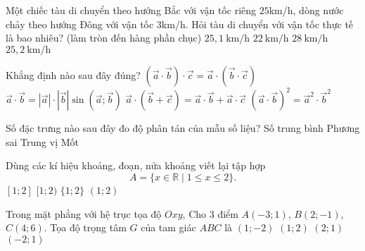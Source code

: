 \begin{ex}%
Một chiếc tàu di chuyển theo hướng Bắc với vận tốc riêng $25$km/h, dòng nước chảy theo hướng Đông với vận tốc $3$km/h. Hỏi tàu di chuyển với vận tốc thực tế là bao nhiêu? (làm tròn đến hàng phần chục)
\choice
{$25{,}1~\mathrm{km/h}$}
{$22~\mathrm{km/h}$}
{$28~\mathrm{km/h}$}
{\True$25{,}2~\mathrm{km/h}$}
\end{ex}
\begin{ex}%
Khẳng định nào sau đây đúng?
\choice
{$(\vec{a} \cdot \vec{b}) \cdot \vec{c}=\vec{a} \cdot(\vec{b} \cdot \vec{c})$}
{$\vec{a} \cdot \vec{b}=|\vec{a}| \cdot|\vec{b}| \sin (\vec{a} ; \vec{b})$}
{\True $\vec{a} \cdot(\vec{b}+\vec{c})=\vec{a} \cdot \vec{b}+\vec{a} \cdot \vec{c}$}
{$(\vec{a} \cdot \vec{b})^2=\vec{a}^2 \cdot \vec{b}^2$}
\end{ex}
\begin{ex}%
Số đặc trưng nào sau đây đo độ phân tán của mẫu số liệu?
\choice
{Số trung bình}
{\True Phương sai}
{Trung vị}
{Mốt}
\end{ex}
\begin{ex}%
Dùng các kí hiệu khoảng, đoạn, nửa khoảng viết lại tập hợp \[A=\{x \in \mathbb{R} \mid 1 \leq x \leq 2\}.\]
\choice
{\True $[1 ; 2]$}
{$[1 ; 2)$}
{$\{1 ; 2\}$}
{$(1 ; 2)$}
\end{ex}
\begin{ex}%
Trong mặt phẳng với hệ trục tọa độ $Oxy$, Cho 3 điểm $A(-3 ; 1)$, $B(2 ;-1)$, $C(4 ; 6)$. Tọa độ trọng tâm $G$ của tam giác $ABC$ là
\choice
{$(1 ;-2)$}
{\True $(1 ; 2)$}
{$(2 ; 1)$}
{$(-2 ; 1)$}
\end{ex}
